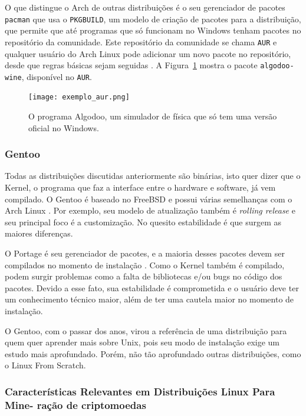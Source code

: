 \documentclass[
article,			%
12pt,				%
openright,			%
oneside,			%
a4paper,			%
chapter=TITLE,		%
section=TITLE,		%
subsection=TITLE,	%
subsubsection=TITLE,%
subsubsubsection=TITLE, %
english,			%
brazil,				%
]{abntex2}
\def\code#1{\texttt{#1}}
\begin{document}
O que distingue o Arch de outras distribuições é o seu gerenciador de
pacotes \code{pacman} que usa o \code{PKGBUILD}, um modelo de criação
de pacotes para a distribuição, que permite que até programas que só
funcionam no Windows tenham pacotes no repositório da comunidade. Este
repositório da comunidade se chama \code{AUR} e qualquer usuário do
Arch Linux pode adicionar um novo pacote no repositório, desde que
regras básicas sejam seguidas \cite{ArchWiki2018d}. A
Figura~\ref{fig:exemplo-aur} mostra o pacote \code{algodoo-wine},
disponível no \code{AUR}.

\begin{figure}[H]
    \caption{\label{fig:exemplo-aur}O programa Algodoo, um simulador
    de física que só tem uma versão oficial no Windows.}
    \begin{center}
        \texttt{[image: exemplo\_aur.png]}
    \end{center}
\end{figure}

\subsubsection{Gentoo}

Todas as distribuições discutidas anteriormente são binárias, isto
quer dizer que o Kernel, o programa que faz a interface entre o
hardware e software, já vem compilado. O Gentoo é baseado no FreeBSD e
possui várias semelhanças com o Arch Linux \cite{GentooFundation2018}.
Por exemplo, seu modelo de atualização também é \emph{rolling release}
e seu principal foco é a customização. No quesito estabilidade é que
surgem as maiores diferenças.

O Portage é seu gerenciador de pacotes, e a maioria desses pacotes
devem ser compilados no momento de instalação \cite{GentooWiki2018}.
Como o Kernel também é compilado, podem surgir problemas como a falta
de bibliotecas e/ou bugs no código dos pacotes. Devido a esse fato,
sua estabilidade é comprometida e o usuário deve ter um conhecimento
técnico maior, além de ter uma cautela maior no momento de instalação.

O Gentoo, com o passar dos anos, virou a referência de uma
distribuição para quem quer aprender mais sobre Unix, pois seu modo de
instalação exige um estudo mais aprofundado. Porém, não tão
aprofundado outras distribuições, como o Linux From Scratch.

\subsubsection{Características Relevantes em Distribuições Linux Para Mine-
ração de criptomoedas}
\end{document}
